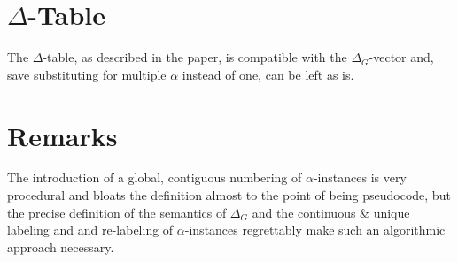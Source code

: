 \documentclass[a4paper, 11pt]{report}
\begin{document}
\section{$\Delta$-Table}

The $\Delta$-table, as described in the paper, is compatible with the $\Delta_G$-vector and, save substituting for multiple $\alpha$ instead of one, can be left as is. 

\section{Remarks}

The introduction of a global, contiguous numbering of $\alpha$-instances is very procedural and bloats the definition almost to the point of being pseudocode, but the precise definition of the semantics of $\Delta_G$ and the continuous \& unique labeling and and re-labeling of $\alpha$-instances regrettably make such an algorithmic approach necessary.\\




\end{document}
